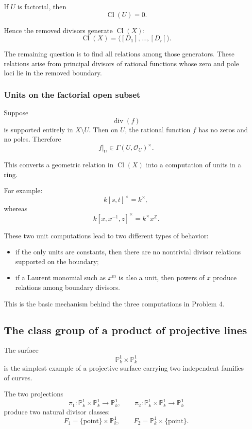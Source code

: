 \documentclass[12pt,a4paper]{article}
\newcommand{\OO}{\mathcal{O}}
\newcommand{\divisor}{\operatorname{div}}
\newcommand{\Z}{\mathbb{Z}}
\newcommand{\Cl}{\operatorname{Cl}}
\providecommand{\Pj}{\mathbb P}
\theoremstyle{notespace}
\begin{document}
If \(U\) is factorial, then
\[
\Cl(U)=0.
\]

Hence the removed divisors generate \(\Cl(X)\):
\[
\Cl(X)
=
\langle [D_1],\dots,[D_r]\rangle.
\]

The remaining question is to find all relations among those generators. These relations arise from principal divisors of rational functions whose zero and pole loci lie in the removed boundary.

\subsubsection{Units on the factorial open subset}

Suppose
\[
\divisor(f)
\]
is supported entirely in \(X\setminus U\). Then on \(U\), the rational function \(f\) has no zeros and no poles. Therefore
\[
f|_U\in \Gamma(U,\OO_U)^\times.
\]

This converts a geometric relation in \(\Cl(X)\) into a computation of units in a ring.

For example:
\[
k[s,t]^\times=k^\times,
\]
whereas
\[
k[x,x^{-1},z]^\times=k^\times x^{\Z}.
\]

These two unit computations lead to two different types of behavior:

\begin{itemize}
	\item if the only units are constants, then there are no nontrivial divisor relations supported on the boundary;
	\item if a Laurent monomial such as \(x^m\) is also a unit, then powers of \(x\) produce relations among boundary divisors.
\end{itemize}

This is the basic mechanism behind the three computations in Problem 4.

\subsection{The class group of a product of projective lines}

The surface
\[
\Pj^1_k\times \Pj^1_k
\]
is the simplest example of a projective surface carrying two independent families of curves.

The two projections
\[
\pi_1:\Pj^1_k\times\Pj^1_k\longrightarrow\Pj^1_k,
\qquad
\pi_2:\Pj^1_k\times\Pj^1_k\longrightarrow\Pj^1_k
\]
produce two natural divisor classes:
\[
F_1=\{\text{point}\}\times \Pj^1_k,
\qquad
F_2=\Pj^1_k\times\{\text{point}\}.
\]
\end{document}
